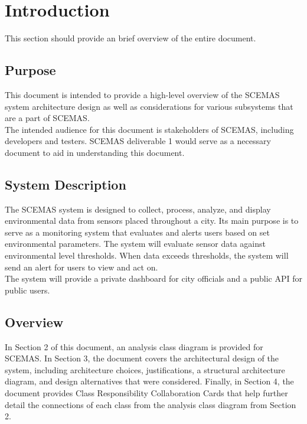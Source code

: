 \documentclass[]{article}
\begin{document}
\newpage
\section{Introduction}
\label{sec:introduction}

This section should provide an brief overview of the entire document.

\subsection{Purpose}
\label{sub:purpose}
This document is intended to provide a high-level overview of the SCEMAS system architecture design as well as considerations for various subsystems that are a part of SCEMAS.\\
The intended audience for this document is stakeholders of SCEMAS, including developers and testers. SCEMAS deliverable 1 would serve as a necessary document to aid in understanding this document.



\subsection{System Description}
\label{sub:system_description}
The SCEMAS system is designed to collect, process, analyze, and display environmental data from sensors placed throughout a city. Its main purpose is to serve as a monitoring system that evaluates and alerts users based on set environmental parameters. The system will evaluate sensor data against environmental level thresholds. When data exceeds thresholds, the system will send an alert for users to view and act on.\\
The system will provide a private dashboard for city officials and a public API for public users.


\subsection{Overview}
\label{sub:overview}
In Section 2 of this document, an analysis class diagram is provided for SCEMAS. In Section 3, the document covers the architectural design of the system, including architecture choices, justifications, a structural architecture diagram, and design alternatives that were considered. Finally, in Section 4, the document provides Class Responsibility Collaboration Cards that help further detail the connections of each class from the analysis class diagram from Section 2.
\end{document}
